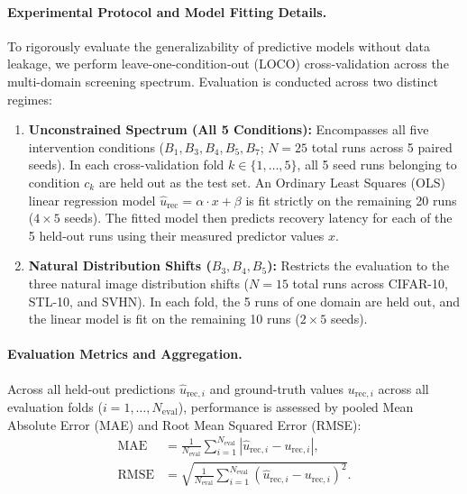 \documentclass[10pt]{article}
\begin{document}
\paragraph{Experimental Protocol and Model Fitting Details.}
To rigorously evaluate the generalizability of predictive models without data leakage, we perform leave-one-condition-out (LOCO) cross-validation across the multi-domain screening spectrum. Evaluation is conducted across two distinct regimes:
\begin{enumerate}
    \item \textbf{Unconstrained Spectrum (All 5 Conditions):} Encompasses all five intervention conditions ($B_1, B_3, B_4, B_5, B_7$; $N = 25$ total runs across 5 paired seeds). In each cross-validation fold $k \in \{1, \dots, 5\}$, all 5 seed runs belonging to condition $c_k$ are held out as the test set. An Ordinary Least Squares (OLS) linear regression model $\hat{u}_{\mathrm{rec}} = \alpha \cdot x + \beta$ is fit strictly on the remaining 20 runs ($4 \times 5$ seeds). The fitted model then predicts recovery latency for each of the 5 held-out runs using their measured predictor values $x$.
    \item \textbf{Natural Distribution Shifts ($B_3, B_4, B_5$):} Restricts the evaluation to the three natural image distribution shifts ($N = 15$ total runs across CIFAR-10, STL-10, and SVHN). In each fold, the 5 runs of one domain are held out, and the linear model is fit on the remaining 10 runs ($2 \times 5$ seeds).
\end{enumerate}

\paragraph{Evaluation Metrics and Aggregation.}
Across all held-out predictions $\hat{u}_{\mathrm{rec}, i}$ and ground-truth values $u_{\mathrm{rec}, i}$ across all evaluation folds ($i = 1, \dots, N_{\mathrm{eval}}$), performance is assessed by pooled Mean Absolute Error (MAE) and Root Mean Squared Error (RMSE):
\begin{align}
\mathrm{MAE} &= \frac{1}{N_{\mathrm{eval}}} \sum_{i=1}^{N_{\mathrm{eval}}} |\hat{u}_{\mathrm{rec}, i} - u_{\mathrm{rec}, i}|, \\
\mathrm{RMSE} &= \sqrt{\frac{1}{N_{\mathrm{eval}}} \sum_{i=1}^{N_{\mathrm{eval}}} (\hat{u}_{\mathrm{rec}, i} - u_{\mathrm{rec}, i})^2}.
\end{align}
\end{document}
